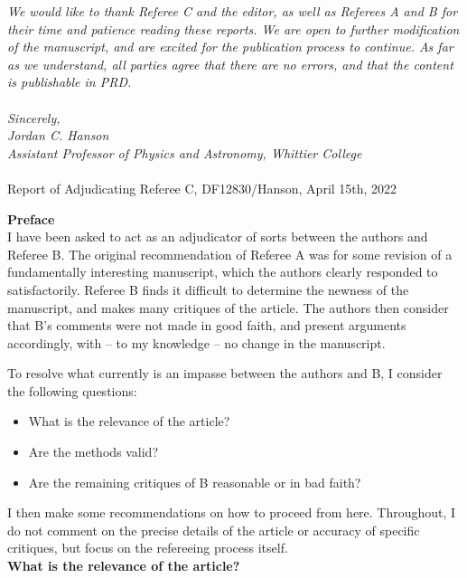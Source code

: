 \documentclass[12pt]{article}
\begin{document}
\textit{We would like to thank Referee C and the editor, as well as Referees A and B for their time and patience reading these reports.  We are open to further modification of the manuscript, and are excited for the publication process to continue.  As far as we understand, all parties agree that there are no errors, and that the content is publishable in PRD. \\ \\
Sincerely, \\
Jordan C. Hanson \\ Assistant Professor of Physics and Astronomy, Whittier College} \\ \\

Report of Adjudicating Referee C, DF12830/Hanson, April 15th, 2022 \\ \vspace{0.25cm}
\hrulefill

\textbf{Preface} \\ 

I have been asked to act as an adjudicator of sorts between the authors and Referee B. The
original recommendation of Referee A was for some revision of a fundamentally interesting
manuscript, which the authors clearly responded to satisfactorily. Referee B finds it difficult
to determine the newness of the manuscript, and makes many critiques of the article. The
authors then consider that B’s comments were not made in good faith, and present
arguments accordingly, with – to my knowledge – no change in the manuscript.

To resolve what currently is an impasse between the authors and B, I consider the following
questions:

\begin{itemize}
\item What is the relevance of the article?
\item Are the methods valid?
\item Are the remaining critiques of B reasonable or in bad faith?
\end{itemize}

I then make some recommendations on how to proceed from here. Throughout, I do not comment on the precise details of the article or accuracy of specific critiques, but focus on the refereeing process itself. \\

\textbf{What is the relevance of the article?} \\
\end{document}

